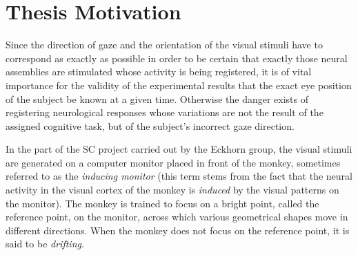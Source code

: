 
\section{Thesis Motivation}
\label{intro:motivation}

Since the direction of gaze and the orientation of the visual stimuli
have to correspond as exactly as possible in order to be certain that
exactly those neural assemblies are stimulated whose activity is being
registered, it is of vital importance for the validity of the
experimental results that the exact eye position of the subject be
known at a given time.  Otherwise the danger exists of registering
neurological responses whose variations are not the result of the
assigned cognitive task, but of the subject's incorrect gaze
direction.  

In the part of the SC project carried out by the Eckhorn group, the
visual stimuli are generated on a computer monitor placed in front of
the monkey, sometimes referred to as the {\em inducing monitor\/}
(this term stems from the fact that the neural activity in the visual
cortex of the monkey is {\em induced\/} by the visual patterns on the
monitor).  The monkey is trained to focus on a bright point, called
the reference point, on the monitor, across which various geometrical
shapes move in different directions.  When the monkey does not focus
on the reference point, it is said to be {\em drifting\/}.

